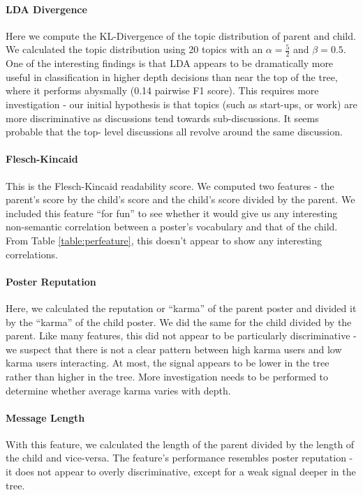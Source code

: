 \documentclass{article}
\begin{document}
\paragraph{LDA Divergence} Here we compute the KL-Divergence of the topic distribution
of parent and child. We calculated the topic distribution using 20 topics with
an $\alpha=\frac{5}{2}$ and $\beta = 0.5$. One of the interesting findings is
that LDA appears to be dramatically more useful in classification in higher
depth decisions than near the top of the tree, where it performs abysmally
(0.14 pairwise F1 score). This requires more investigation - our initial
hypothesis is that topics (such as start-ups, or work) are more discriminative
as discussions tend towards sub-discussions. It seems probable that the top-
level discussions all revolve around the same discussion.

\paragraph{Flesch-Kincaid} This is the Flesch-Kincaid readability score. We computed
two features - the parent's score by the child's score and the child's score
divided by the parent. We included this feature ``for fun'' to see whether it
would give us any interesting non-semantic correlation between a poster's
vocabulary and that of the child. From Table \ref{table:perfeature}, this
doesn't appear to show any interesting correlations.

\paragraph{Poster Reputation} Here, we calculated the reputation or ``karma'' of the
parent poster and divided it by the ``karma'' of the child poster. We did the
same for the child divided by the parent. Like many features, this did not
appear to be particularly discriminative - we suspect that there is not a
clear pattern between high karma users and low karma users interacting. At
most, the signal appears to be lower in the tree rather than higher in the
tree. More investigation needs to be performed to determine whether average
karma varies with depth.

\paragraph{Message Length} With this feature, we calculated the length of the
parent divided by the length of the child and vice-versa. The feature's
performance resembles poster reputation - it does not appear to overly
discriminative, except for a weak signal deeper in the tree.
\end{document}
